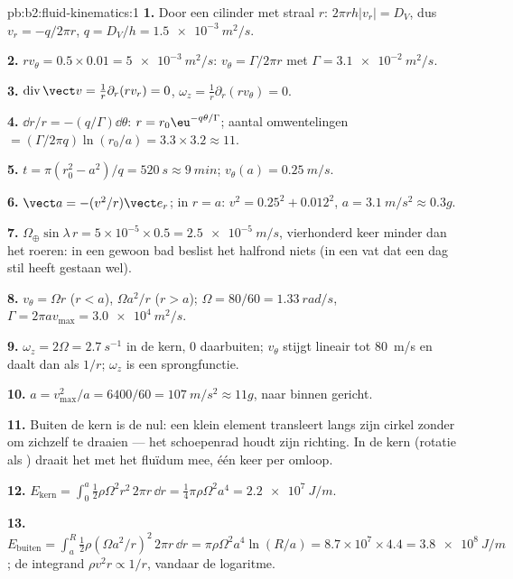 \begin{solution}{pb:b2:fluid-kinematics:1}
\textbf{1.} Door een cilinder met straal $r$: $2\pi rh|v_r| = D_V$, dus
$v_r = -q/2\pi r$, $q = D_V/h = \qty{1.5e-3}{m^2/s}$.

\textbf{2.} $rv_\theta = 0.5 \times 0.01 = \qty{5e-3}{m^2/s}$:
$v_\theta = \Gamma/2\pi r$ met $\Gamma = \qty{3.1e-2}{m^2/s}$.

\textbf{3.} $\operatorname{div}\vect v = \frac1r\partial_r(rv_r) = 0$,
$\omega_z =
\frac1r\partial_r(rv_\theta) = 0$.

\textbf{4.} $\dd r/r = -(q/\Gamma)\dd\theta$:
$r = r_0\eu^{-q\theta/\Gamma}$; aantal omwentelingen
$= (\Gamma/2\pi q)\ln(r_0/a) = 3.3 \times 3.2 \approx 11$.

\textbf{5.} $t = \pi(r_0^2 - a^2)/q = \qty{520}{s} \approx \qty{9}{min}$;
$v_\theta(a) =
\qty{0.25}{m/s}$.

\textbf{6.} $\vect a = -(v^2/r)\vect e_r$; in $r = a$:
$v^2 = 0.25^2 + 0.012^2$, $a = \qty{3.1}{m/s^2} \approx 0.3g$.

\textbf{7.}
$\Omega_\oplus\sin\lambda\,r = 5 \times 10^{-5} \times 0.5 = \qty{2.5e-5}{m/s}$,
vierhonderd keer minder dan het roeren: in een gewoon bad beslist het
halfrond niets (in een vat dat een dag stil heeft gestaan wel).

\textbf{8.} $v_\theta = \Omega r$ ($r < a$), $\Omega a^2/r$ ($r > a$);
$\Omega = 80/60
= \qty{1.33}{rad/s}$,
$\Gamma = 2\pi av_{\max} = \qty{3.0e4}{m^2/s}$.

\textbf{9.} $\omega_z = 2\Omega = \qty{2.7}{s^{-1}}$ in de kern, $0$
daarbuiten; $v_\theta$ stijgt lineair tot \qty{80}{m/s} en daalt dan als
$1/r$; $\omega_z$ is een sprongfunctie.

\textbf{10.} $a = v_{\max}^2/a = 6400/60 = \qty{107}{m/s^2} \approx 11g$,
naar binnen gericht.

\textbf{11.} Buiten de kern is de  nul: een klein element
transleert langs zijn cirkel zonder om zichzelf te draaien --- het
schoepenrad houdt zijn richting. In de kern (rotatie als )
draait het met het fluïdum mee, één keer per omloop.

\textbf{12.}
$E_{\text{kern}} = \int_0^a\tfrac12\rho\Omega^2r^2\,2\pi r\,\dd r =
\tfrac14\pi\rho\Omega^2a^4 = \qty{2.2e7}{J/m}$.

\textbf{13.}
$E_{\text{buiten}} = \int_a^R\tfrac12\rho(\Omega a^2/r)^2\,2\pi r\,\dd r =
\pi\rho\Omega^2a^4\ln(R/a) = 8.7 \times 10^7 \times 4.4 = \qty{3.8e8}{J/m}$;
de integrand $\rho v^2r \propto 1/r$, vandaar de logaritme.


\end{solution}
